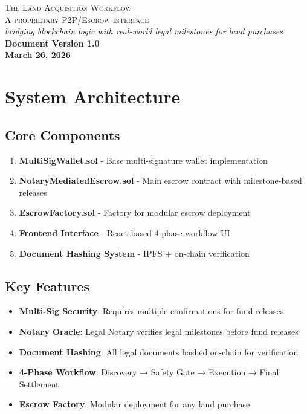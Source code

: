 \documentclass[12pt,a4paper]{article}
\begin{document}
\begin{titlepage}
\vspace*{1in}
\begin{center}
\textcolor{sectionblue}{\Huge\scshape The Land Acquisition Workflow}\\[0.5in]

\textsc{\large A proprietary P2P/Escrow interface}\\[0.3in]
\textit{bridging blockchain logic with real-world legal milestones for land purchases}\\[1in]

\textbf{Document Version 1.0}\\
\textbf{March 26, 2026}
\end{center}
\end{titlepage}

\newpage

\section{System Architecture}

\subsection{Core Components}
\begin{enumerate}
\item \textbf{MultiSigWallet.sol} - Base multi-signature wallet implementation
\item \textbf{NotaryMediatedEscrow.sol} - Main escrow contract with milestone-based releases
\item \textbf{EscrowFactory.sol} - Factory for modular escrow deployment
\item \textbf{Frontend Interface} - React-based 4-phase workflow UI
\item \textbf{Document Hashing System} - IPFS + on-chain verification
\end{enumerate}

\subsection{Key Features}
\begin{itemize}
\item \textbf{Multi-Sig Security}: Requires multiple confirmations for fund releases
\item \textbf{Notary Oracle}: Legal Notary verifies legal milestones before fund releases
\item \textbf{Document Hashing}: All legal documents hashed on-chain for verification
\item \textbf{4-Phase Workflow}: Discovery → Safety Gate → Execution → Final Settlement
\item \textbf{Escrow Factory}: Modular deployment for any land purchase
\end{itemize}
\end{document}

